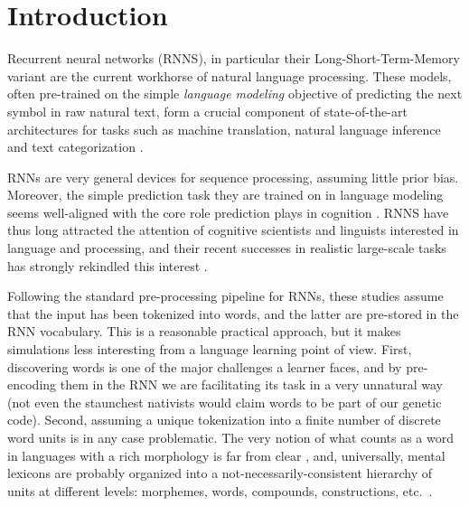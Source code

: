 \section{Introduction}
\label{sec:introduction}

Recurrent neural networks (RNNS), in particular their Long-Short-Term-Memory
variant \cite[LSTMs,][]{Hochreiter:Schmidhuber:1997} are the current workhorse
of natural language processing. These models, often pre-trained on the
simple \emph{language modeling} objective of predicting the next
symbol in raw natural text, form a crucial component of
state-of-the-art architectures for tasks such as machine translation,
natural language inference and text categorization
\cite{Goldberg:2017}.

RNNs are very general devices for sequence processing, assuming little
prior bias. Moreover, the simple prediction task they are trained on
in language modeling seems well-aligned with the core role prediction
plays in cognition \cite[e.g.,][]{Bar:2007,Clark:2016}. RNNS have thus
long attracted the attention of cognitive scientists and linguists
interested in language and processing, and their recent successes in
realistic large-scale tasks has strongly rekindled this interest
\cite[see, e.g.,][and references there]{Frank:etal:2013,Lau:etal:2017,Kirov:Cotterell:2018,McCoy:etal:2018,Pater:2018}.

Following the standard pre-processing pipeline for RNNs, these studies
assume that the input has been tokenized into words, and the latter
are pre-stored in the RNN vocabulary. This is a reasonable practical
approach, but it makes simulations less interesting from a language
learning point of view. First, discovering words is one of the major
challenges a learner faces, and by pre-encoding them in the RNN we are
facilitating its task in a very unnatural way (not even the staunchest
nativists would claim words to be part of our genetic code). Second,
assuming a unique tokenization into a finite number of discrete word
units is in any case problematic. The very notion of what counts as a
word in languages with a rich morphology is far from clear
\cite[e.g.,][]{Bickel:Zuniga:2017}, and, universally, mental lexicons
are probably organized into a not-necessarily-consistent hierarchy of
units at different levels: morphemes, words, compounds, constructions,
etc.~\cite[e.g.,][]{Goldberg:2005}.

